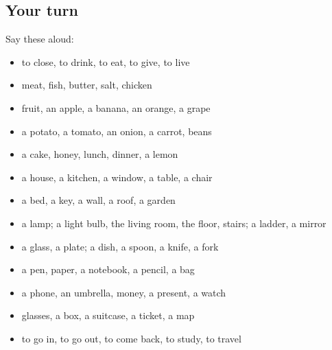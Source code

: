 \subsection*{Your turn}
Say these aloud:

\begin{itemize}
\raggedright
  \item to close, to drink, to eat, to give, to live
  \item meat, fish, butter, salt, chicken
  \item fruit, an apple, a banana, an orange, a grape
  \item a potato, a tomato, an onion, a carrot, beans
  \item a cake, honey, lunch, dinner, a lemon
  \item a house, a kitchen, a window, a table, a chair
  \item a bed, a key, a wall, a roof, a garden
  \item a lamp; a light bulb, the living room, the floor, stairs; a ladder, a mirror
  \item a glass, a plate; a dish, a spoon, a knife, a fork
  \item a pen, paper, a notebook, a pencil, a bag
  \item a phone, an umbrella, money, a present, a watch
  \item glasses, a box, a suitcase, a ticket, a map
  \item to go in, to go out, to come back, to study, to travel
\end{itemize}

